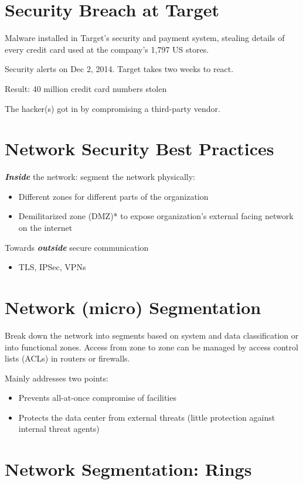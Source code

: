 \documentclass[11pt]{article}
\begin{document}
\section*{Security Breach at Target}

Malware installed in Target's security and payment system, stealing details of every credit card used at the company's 1,797 US stores. 

Security alerts on Dec 2, 2014. Target takes two weeks to react. 

Result: 40 million credit card numbers stolen

The hacker(s) got in by compromising a third-party vendor.

\section*{Network Security Best Practices}

\textbf{\textit{Inside}} the network: segment the network physically:
\begin{itemize}
	\item Different zones for different parts of the organization
	\item Demilitarized zone (DMZ)* to expose organization's external facing network on the internet
\end{itemize}

Towards \textit{\textbf{outside}} secure communication
\begin{itemize}
	\item TLS, IPSec, VPNs
\end{itemize}

\section*{Network (micro) Segmentation}

Break down the network into segments based on system and data classification or into functional zones. Access from zone to zone can be managed by access control lists (ACLs) in routers or firewalls.

Mainly addresses two points:
\begin{itemize}
	\item Prevents all-at-once compromise of facilities
	\item Protects the data center from external threats (little protection against internal threat agents)
\end{itemize}

\section*{Network Segmentation: Rings}
\end{document}
